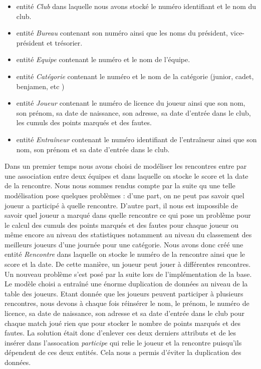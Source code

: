 \documentclass{article}
\begin{document}
\begin{itemize}
\item entité \textit{Club} dans laquelle nous avons stocké le numéro identifiant et le nom du club.
\item entité \textit{Bureau} contenant son numéro ainsi que les noms du président, vice-président et trésorier. 
\item entité \textit{Equipe} contenant le numéro et le nom de l'équipe.
\item entité \textit{Catégorie} contenant le numéro et le nom de la catégorie (junior, cadet, benjamen, etc )
\item entité \textit{Joueur} contenant le numéro de licence du joueur ainsi que son nom, son prénom, sa date de naissance, son adresse, sa date d'entrée dans le club, les cumuls des points marqués et des fautes.
\item entité \textit{Entraîneur} contenant le numéro identifiant de l'entraîneur ainsi que son nom, son prénom et sa date d'entrée dans le club. \\
\end{itemize}



Dans un premier temps nous avons choisi de modéliser les rencontres entre par une association entre deux équipes et dans laquelle on stocke le score et la date de la rencontre. Nous nous sommes rendus compte par la suite qu une telle modélisation pose quelques problèmes : d'une part, on ne peut pas savoir quel joueur a participé à quelle rencontre. D'autre part, il nous est impossible de savoir quel joueur a marqué dans quelle rencontre ce qui pose un problème pour le calcul des cumuls des points marqués et des fautes pour chaque joueur ou même encore au niveau des statistiques notamment au niveau du classement des meilleurs joueurs d'une journée pour une catégorie. Nous avons donc créé une entité \textit{Rencontre} dans laquelle on stocke le numéro de la rencontre ainsi que le score et la date. De cette manière, un joueur peut jouer à différentes rencontres.
\\

Un nouveau problème s'est posé par la suite lors de l'implémentation de la base. Le modèle choisi a entraîné une énorme duplication de données au niveau de la table des joueurs. Etant donnée que les joueurs peuvent participer à plusieurs rencontres, nous devons à chaque fois réinsérer le nom, le prénom, le numéro de licence, sa date de naissance, son adresse et sa date d'entrée dans le club pour chaque match joué rien que pour stocker le nombre de points marqués et des fautes. La solution était donc d'enlever ces deux derniers attributs et de les insérer dans l'assocation \textit{participe} qui relie le joueur et la rencontre puisqu'ils dépendent de ces deux entités. Cela nous a permis d'éviter la duplication des données.
\\
\end{document}
